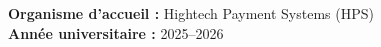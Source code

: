 \begin{titlepage}
\begin{center}
        \vspace{1cm}

        \begin{minipage}{0.9\textwidth}
            \centering
            \textbf{Organisme d'accueil :} Hightech Payment Systems (HPS)\\[0.2cm]
            \textbf{Année universitaire :} 2025--2026
        \end{minipage}
    \end{center}
\end{titlepage}
